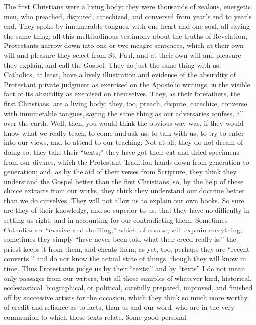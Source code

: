 The first Christians were a living body; they were
thousands of zealous, energetic men, who preached,
disputed, catechized, and conversed from year's end to
year's end. They spoke by innumerable tongues, with one
heart and one soul, all saying the same thing; all this
multitudinous testimony about the truths of Revelation,
Protestants narrow down into one or two meagre sentences,
which at their own will and pleasure they select from St.
Paul, and at their own will and pleasure they explain,
and call the Gospel. They do just the same thing with us;
Catholics, at least, have a lively illustration and
evidence of the absurdity of Protestant private judgment
as exercised on the Apostolic writings, in the visible
fact of its absurdity as exercised on themselves. They,
as their forefathers, the first Christians, are a living
body; they, too, preach, dispute, catechize, converse
with innumerable tongues, saying the same thing as our
adversaries confess, all over the earth. Well, then, you
would think the obvious way was, if they would know what
we really teach, to come and ask us, to talk with us, to
try to enter into our views, and to attend to our
teaching. Not at all; they do not dream of doing so; they
take their ``texts;'' they have got their
cut-and-dried specimens from our divines, which the
Protestant Tradition hands down from generation to
generation; and, as by the aid of their verses from
Scripture, they think they understand the Gospel better
than the first Christians, so, by the help of these
choice extracts from our works, they think they
understand our doctrine better than we do ourselves. They
will not allow us to explain our own books. So sure are
they of their knowledge, and so superior to us, that they
have no difficulty in setting us right, and in accounting
for our contradicting them. Sometimes Catholics are
``evasive and shuffling,'' which, of course, will
explain everything; sometimes they simply ``have
never been told what their creed really is;'' the
priest keeps it from them, and cheats them; as yet, too,
perhaps they are ``recent converts,'' and do not
know the actual state of things, though they will know in
time. Thus Protestants judge us by their
``texts;'' and by ``texts'' I do not mean
only passages from our writers, but all those samples of
whatever kind, historical, ecclesiastical, biographical,
or political, carefully prepared, improved, and finished
off by successive artists for the occasion, which they
think so much more worthy of credit and reliance as to
facts, than us and our word, who are in the very
communion to which those texts relate. Some good personal
